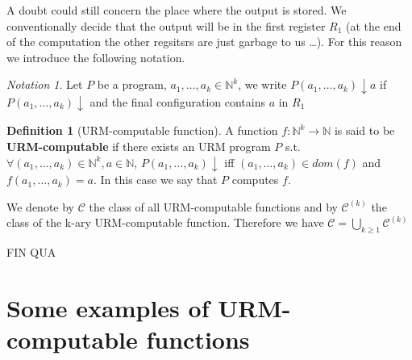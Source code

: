 \documentclass{amsbook}
\newcommand{\nat}{\ensuremath{\mathbb{N}}}
\theoremstyle{definition}
\newtheorem{definition}[theorem]{Definition}
\theoremstyle{remark}
\newtheorem{notation}[theorem]{Notation}
\numberwithin{section}{chapter}
\numberwithin{equation}{chapter}
\begin{document}
A doubt could still concern the place where the output is stored. We conventionally decide that the output will be in the first register $R_1$ (at the end of the computation the other regsitsrs are just garbage to us \dots). For this reason we introduce the following notation.

\begin{notation}
  Let $P$ be a program, $a_1,\dots,a_k \in \nat^k$, we write
  $P(a_1,\dots,a_k)\downarrow a$ if $P(a_1,\dots,a_k) \downarrow$ and
  the final configuration contains $a$ in $R_1$
\end{notation}

\begin{definition}[URM-computable function]
  A function $f:\nat^k\rightarrow\nat$ is said to be
  \textbf{URM-computable} if there exists an URM program $P$ s.t.
  $\forall (a_1,\dots,a_k) \in \nat^k, a\in\nat$,
  $P(a_1,\dots,a_k)\downarrow$ iff $(a_1,\dots,a_k)\in dom(f)$ and
  $f(a_1,\dots,a_k) = a$. In this case we say that $P$ computes $f$.

  We denote by $\mathcal{C}$ the class of all URM-computable
  functions and by $\mathcal{C}^{(k)}$ the class of the k-ary
  URM-computable function.
  Therefore we have
  $\mathcal{C} = \bigcup_{k\geq 1} \mathcal{C}^{(k)}$
\end{definition}

FIN QUA

\section{Some examples of URM-computable functions}
\end{document}
